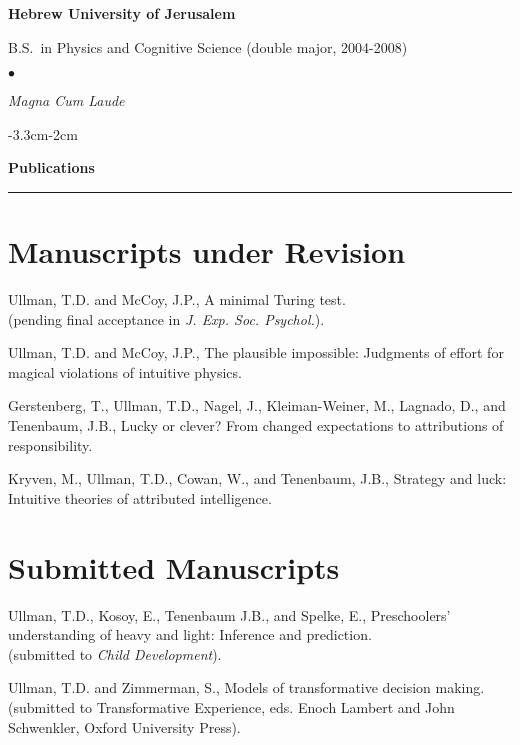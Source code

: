\documentclass[margin,line,pifont,palatino,courier]{res}
\newenvironment{list1}{
  \begin{list}{\ding{113}}{%
      \setlength{\itemsep}{0in}
      \setlength{\parsep}{0in} \setlength{\parskip}{0in}
      \setlength{\topsep}{0in} \setlength{\partopsep}{0in}
      \setlength{\leftmargin}{0.17in}}}{\end{list}}
\newenvironment{list2}{
  \begin{list}{$\bullet$}{%
      \setlength{\itemsep}{0in}
      \setlength{\parsep}{0in} \setlength{\parskip}{0in}
      \setlength{\topsep}{0in} \setlength{\partopsep}{0in}
      \setlength{\leftmargin}{0.2in}}}{\end{list}}
\begin{document}
\begin{resume}
{\bf Hebrew University of Jerusalem}\\
\vspace*{-.1in}
\begin{list1}
\item[] B.S.~in Physics and Cognitive Science (double major, 2004-2008)

\begin{list2}
\vspace*{.05in}
\item \textit{Magna Cum Laude}
\end{list2}

\end{list1}

\begin{adjustwidth*}{-3.3cm}{-2cm}

\textbf{Publications}\\
\noindent\rule{8cm}{0.4pt}

\end{adjustwidth*}

\section{\sc Manuscripts under Revision}

Ullman, T.D. and McCoy, J.P., A minimal Turing test.\\ (pending final acceptance in \textit{J. Exp. Soc. Psychol.}).

Ullman, T.D. and McCoy, J.P., The plausible impossible: Judgments of effort for magical violations of intuitive physics.

Gerstenberg, T., Ullman, T.D., Nagel, J., Kleiman-Weiner, M., Lagnado, D., and Tenenbaum, J.B., Lucky or clever? From changed expectations to attributions of responsibility.

Kryven, M., Ullman, T.D., Cowan, W., and Tenenbaum, J.B., Strategy and luck: Intuitive theories of attributed intelligence.

\section{\sc Submitted Manuscripts}

Ullman, T.D., Kosoy, E., Tenenbaum J.B., and Spelke, E., Preschoolers' understanding of heavy and light: Inference and prediction. \\(submitted to \textit{Child Development}).

Ullman, T.D. and Zimmerman, S., Models of transformative decision making. \\(submitted to Transformative Experience, eds. Enoch Lambert and John Schwenkler, Oxford University Press).


\end{resume}
\end{document}
